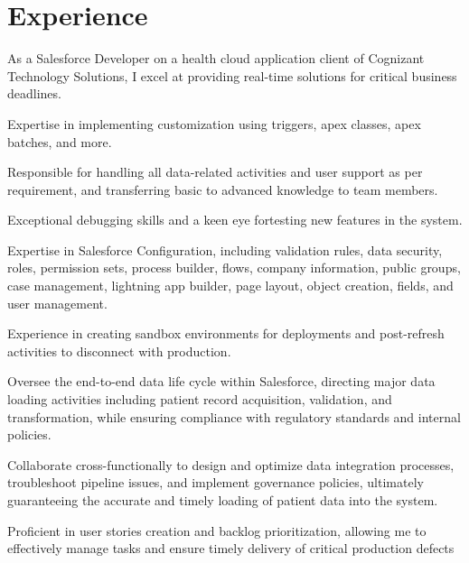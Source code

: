 \documentclass[]{resume-openfont}
\begin{document}
\begin{minipage}[t]{0.66\textwidth} 


\section{Experience}
\sectionsep


\vspace{\topsep} %
\begin{tightemize}
\item  As a Salesforce Developer on a health cloud application client of
Cognizant Technology Solutions, I excel at providing real-time solutions for
critical business deadlines. \newline
\item  Expertise in implementing customization using triggers, apex classes, apex
batches, and more. \newline
\item  Responsible for handling all data-related activities and user support as per
requirement, and transferring basic to advanced knowledge to team members. \newline
\item Exceptional debugging skills and a keen eye fortesting new features in the
system. \newline
\item  Expertise in Salesforce Configuration, including validation rules, data security,
roles, permission sets, process builder, flows, company
information, public groups, case management, lightning app builder, page
layout, object creation, fields, and user management.\newline
\item  Experience in creating sandbox environments for deployments and
post-refresh activities to disconnect with production.\newline
\item Oversee the end-to-end data life cycle within Salesforce, directing major data loading activities including patient record acquisition, validation, and transformation, while ensuring compliance with regulatory standards and internal policies.\newline
\item Collaborate cross-functionally to design and optimize data integration processes, troubleshoot pipeline issues, and implement governance policies, ultimately guaranteeing the accurate and timely loading of patient data into the system.\newline
\item Proficient in user stories creation and backlog prioritization, allowing me to effectively manage tasks and ensure timely delivery of critical  production defects\newline


\end{tightemize}
\end{minipage}
\end{document}
